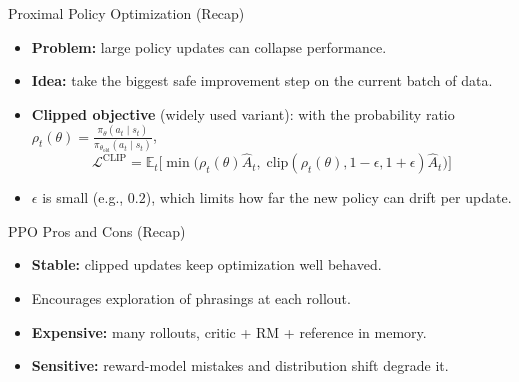 \begin{frame}{Proximal Policy Optimization (Recap)}
    \begin{itemize}\itemsep0.32em
      \item[\textcolor{red}{$\blacktriangleright$}] \textbf{Problem:} large policy updates can collapse performance.
      \item[\textcolor{red}{$\blacktriangleright$}] \textbf{Idea:} take the biggest safe improvement step on the current batch of data.
      \item[\textcolor{red}{$\blacktriangleright$}] \textbf{Clipped objective} (widely used variant): with the probability ratio $\rho_t(\theta) = \frac{\pi_\theta(a_t \mid s_t)}{\pi_{\theta_{\mathrm{old}}}(a_t \mid s_t)}$,
        \[
          \mathcal{L}^{\mathrm{CLIP}} = \mathbb{E}_t\Big[\min\big(\rho_t(\theta)\hat{A}_t,\; \mathrm{clip}(\rho_t(\theta), 1-\epsilon, 1+\epsilon)\hat{A}_t\big)\Big]
        \]
      \item[\textcolor{red}{$\blacktriangleright$}] $\epsilon$ is small (e.g., $0.2$), which limits how far the new policy can drift per update.
    \end{itemize}
  \end{frame}

\begin{frame}{PPO Pros and Cons (Recap)}
  \begin{itemize}\itemsep0.4em
    \item[\textcolor{red}{$\blacktriangleright$}] \textbf{Stable:} clipped updates keep optimization well behaved.
    \item[\textcolor{red}{$\blacktriangleright$}] Encourages exploration of phrasings at each rollout.
    \item[\textcolor{red}{$\blacktriangleright$}] \textbf{Expensive:} many rollouts, critic + RM + reference in memory.
    \item[\textcolor{red}{$\blacktriangleright$}] \textbf{Sensitive:} reward-model mistakes and distribution shift degrade it.
  \end{itemize}
\end{frame}

